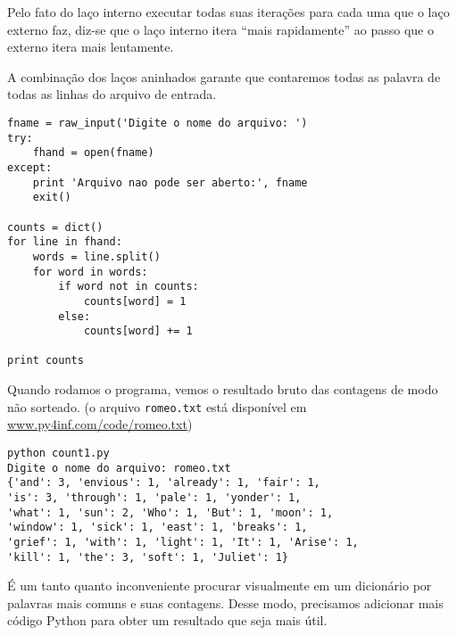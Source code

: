 Pelo fato do laço interno executar todas suas iterações para cada uma que o laço externo faz, diz-se que o laço interno itera ``mais rapidamente'' ao passo que o externo itera mais lentamente.

A combinação dos laços aninhados garante que contaremos todas as palavra de todas as linhas do arquivo de entrada.

\beforeverb
\begin{verbatim}
fname = raw_input('Digite o nome do arquivo: ')
try:
    fhand = open(fname)
except:
    print 'Arquivo nao pode ser aberto:', fname
    exit()

counts = dict()
for line in fhand:
    words = line.split()
    for word in words:
        if word not in counts:
            counts[word] = 1
        else:
            counts[word] += 1

print counts
\end{verbatim}
\afterverb
%
Quando rodamos o programa, vemos o resultado bruto das contagens de modo não sorteado.
(o arquivo {\tt romeo.txt} está disponível em \url{www.py4inf.com/code/romeo.txt})

\beforeverb
\begin{verbatim}
python count1.py
Digite o nome do arquivo: romeo.txt
{'and': 3, 'envious': 1, 'already': 1, 'fair': 1,
'is': 3, 'through': 1, 'pale': 1, 'yonder': 1,
'what': 1, 'sun': 2, 'Who': 1, 'But': 1, 'moon': 1,
'window': 1, 'sick': 1, 'east': 1, 'breaks': 1,
'grief': 1, 'with': 1, 'light': 1, 'It': 1, 'Arise': 1,
'kill': 1, 'the': 3, 'soft': 1, 'Juliet': 1}
\end{verbatim}
\afterverb
%
É um tanto quanto inconveniente procurar visualmente em um dicionário por palavras mais comuns e suas contagens. Desse modo, precisamos adicionar mais código Python para obter um resultado que seja mais útil.

